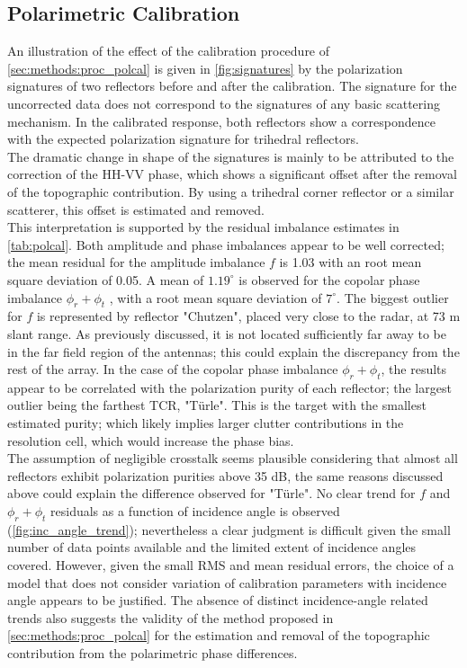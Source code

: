 \subsection{Polarimetric Calibration}
An illustration of the effect of the calibration procedure of \autoref{sec:methods:proc_polcal} is given in  \autoref{fig:signatures} by the polarization signatures of two reflectors before and after the calibration.
The signature for the uncorrected data does not correspond to the signatures of any basic scattering mechanism. In the calibrated response, both reflectors show a correspondence with the expected polarization signature for trihedral reflectors.\\ The dramatic change in shape of the signatures is mainly to be attributed to the correction of the HH-VV phase, which shows a significant offset after the removal of the topographic contribution. By using a trihedral corner reflector or a similar scatterer, this offset is estimated and removed.\\
This interpretation is supported by the residual imbalance estimates in \autoref{tab:polcal}.
Both amplitude and  phase imbalances appear to be well corrected; the mean residual for the amplitude imbalance $f$ is 1.03 with an root mean square deviation of 0.05. A mean of $1.19^\circ$ is observed for the copolar phase imbalance $\phi_r + \phi_t$ , with a root mean square deviation of $7^\circ$. The biggest outlier for $f$ is represented by reflector "Chutzen", placed very close to the radar, at 73 m slant range. As previously discussed, it is not located sufficiently far away to be in the far field region of the antennas; this could explain the discrepancy from the rest of the array. In the case of the copolar phase imbalance $\phi_r + \phi_t$, the results appear to be correlated with the polarization purity of each reflector; the largest outlier being the farthest TCR, "T\"{u}rle". This is the target with the smallest estimated purity; which likely implies larger clutter contributions in the resolution cell, which would increase the phase bias.\\
The assumption of negligible crosstalk seems plausible considering that almost all reflectors exhibit polarization purities above 35 dB, the same reasons discussed above could explain the difference observed for  "T\"{u}rle".
No clear trend for $f$ and $\phi_r + \phi_t$ residuals as a function of incidence angle is observed (\autoref{fig:inc_angle_trend}); nevertheless a clear judgment is difficult given the small number of data points available and the limited extent of incidence angles covered. However, given the small RMS and mean residual errors, the choice of a model that does not consider variation of calibration parameters with incidence angle appears to be justified. The absence of distinct incidence-angle related trends also suggests the validity of the method proposed in \autoref{sec:methods:proc_polcal} for the estimation and removal of the topographic contribution from the polarimetric phase differences.\\
